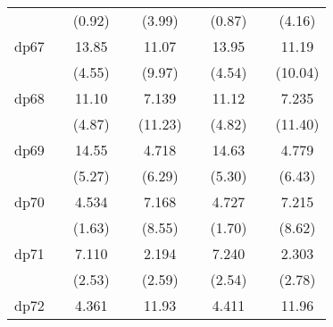{\begin{tabular}{l*{8}{c}}
            &                     &      (0.92)         &                     &      (3.99)         &                     &      (0.87)         &                     &      (4.16)         \\
[1em]
dp67        &                     &       13.85\sym{***}&                     &       11.07\sym{***}&                     &       13.95\sym{***}&                     &       11.19\sym{***}\\
            &                     &      (4.55)         &                     &      (9.97)         &                     &      (4.54)         &                     &     (10.04)         \\
[1em]
dp68        &                     &       11.10\sym{***}&                     &       7.139\sym{***}&                     &       11.12\sym{***}&                     &       7.235\sym{***}\\
            &                     &      (4.87)         &                     &     (11.23)         &                     &      (4.82)         &                     &     (11.40)         \\
[1em]
dp69        &                     &       14.55\sym{***}&                     &       4.718\sym{***}&                     &       14.63\sym{***}&                     &       4.779\sym{***}\\
            &                     &      (5.27)         &                     &      (6.29)         &                     &      (5.30)         &                     &      (6.43)         \\
[1em]
dp70        &                     &       4.534         &                     &       7.168\sym{***}&                     &       4.727         &                     &       7.215\sym{***}\\
            &                     &      (1.63)         &                     &      (8.55)         &                     &      (1.70)         &                     &      (8.62)         \\
[1em]
dp71        &                     &       7.110\sym{*}  &                     &       2.194\sym{**} &                     &       7.240\sym{*}  &                     &       2.303\sym{**} \\
            &                     &      (2.53)         &                     &      (2.59)         &                     &      (2.54)         &                     &      (2.78)         \\
[1em]
dp72        &                     &       4.361         &                     &       11.93\sym{***}&                     &       4.411         &                     &       11.96\sym{***}\\

\end{tabular}}
